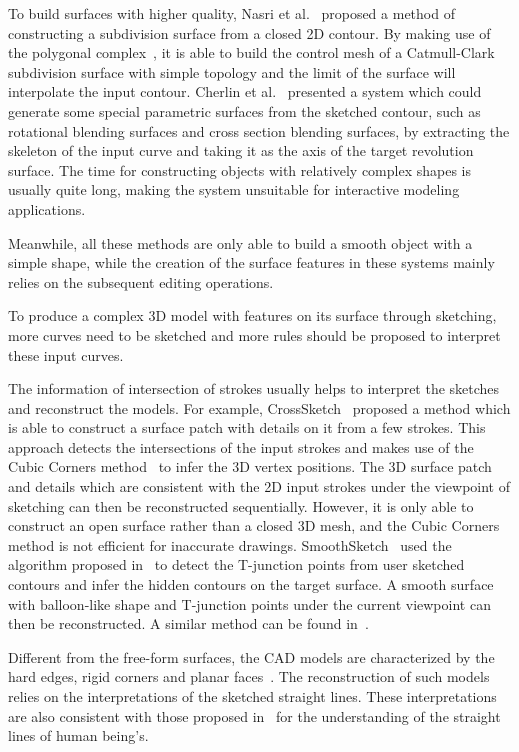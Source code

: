 To build surfaces with higher quality,  Nasri et al.~\cite{NKS09}
proposed a method of constructing a subdivision surface from a
closed 2D contour. By making use of the polygonal
complex~\cite{NA00}, it is able to build the control mesh of a
Catmull-Clark subdivision surface with simple topology and the limit
of the surface will interpolate the input contour. Cherlin et
al.~\cite{CSSJ05} presented a system which could generate some
special parametric surfaces from the sketched contour, such as
rotational blending surfaces and cross section blending surfaces, by
extracting the skeleton of the input curve and taking it as the axis
of the target revolution surface. The time for constructing objects
with relatively complex shapes is usually quite long, making the
system unsuitable for interactive modeling applications.

Meanwhile, all these methods are only  able to build a smooth object
with a simple shape, while the creation of the surface features in
these systems mainly relies on the subsequent editing operations.

To produce a complex 3D model with features  on its surface through
sketching, more curves need to be sketched and more rules should be
proposed to interpret these input curves.

The information of intersection of strokes  usually helps to
interpret the sketches and reconstruct the models. For example,
CrossSketch~\cite{ASN07} proposed a method which is able to
construct a surface patch with details on it from a few strokes.
This approach detects the intersections of the input strokes and
makes use of the Cubic Corners method~\cite{DP1968} to infer the 3D
vertex positions. The 3D surface patch and details which are
consistent with the 2D input strokes under the viewpoint of
sketching can then be reconstructed sequentially. However, it is
only able to construct an open surface rather than a closed 3D mesh,
and the Cubic Corners method is not efficient for inaccurate
drawings. SmoothSketch~\cite{KH06} used the algorithm proposed
in~\cite{WH96} to detect the T-junction points from user sketched
contours and infer the hidden contours on the target surface. A
smooth surface with balloon-like shape and T-junction points under
the current viewpoint can then be reconstructed. A similar method
can be found in~\cite{CS07}.

Different from the free-form surfaces, the  CAD models are
characterized by the hard edges, rigid corners and planar
faces~\cite{OSSJ09}. The reconstruction of such models relies on the
interpretations of the sketched straight lines. These
interpretations are also consistent with those proposed
in~\cite{HD00} for the understanding of the straight lines of human
being's.

